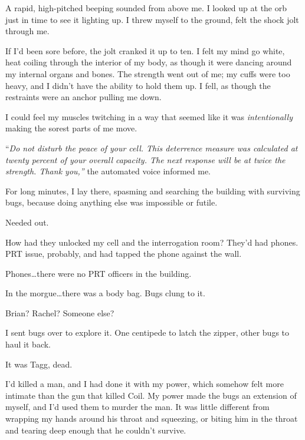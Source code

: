 A rapid, high-pitched beeping sounded from above me.  I looked up at the orb just in time to see it lighting up.  I threw myself to the ground, felt the shock jolt through me.



If I'd been sore before, the jolt cranked it up to ten.  I felt my mind go white, heat coiling through the interior of my body, as though it were dancing around my internal organs and bones.  The strength went out of me; my cuffs were too heavy, and I didn't have the ability to hold them up.  I fell, as though the restraints were an anchor pulling me down.



I could feel my muscles twitching in a way that seemed like it was \emph{intentionally} making the sorest parts of me move.



``\emph{Do not disturb the peace of your cell.  This deterrence measure was calculated at twenty percent of your overall capacity.  The next response will be at twice the strength.  Thank you,'' }the automated voice informed me.



For long minutes, I lay there, spasming and searching the building with surviving bugs, because doing anything else was impossible or futile.



Needed out.



How had they unlocked my cell and the interrogation room?  They'd had phones.  PRT issue, probably, and had tapped the phone against the wall.



Phones\ldots there were no PRT officers in the building.



In the morgue\ldots there was a body bag.  Bugs clung to it.



Brian?  Rachel?  Someone else?



I sent bugs over to explore it.  One centipede to latch the zipper, other bugs to haul it back.



It was Tagg, dead.



I'd killed a man, and I had done it with my power, which somehow felt more intimate than the gun that killed Coil.  My power made the bugs an extension of myself, and I'd used them to murder the man.  It was little different from wrapping my hands around his throat and squeezing, or biting him in the throat and tearing deep enough that he couldn't survive.



